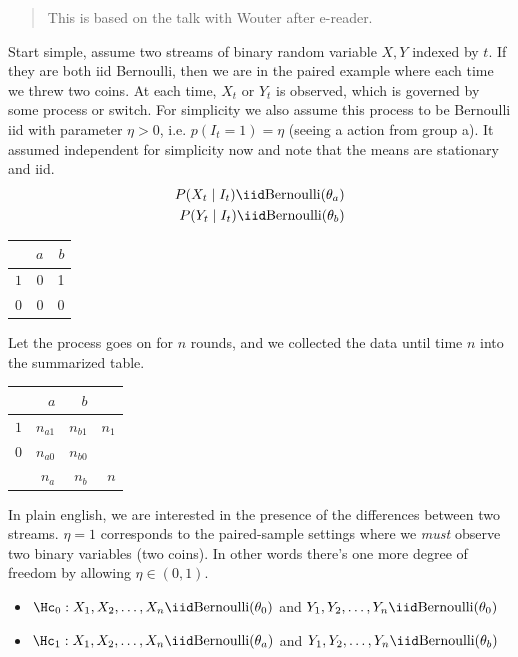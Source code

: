 \begin{quote}
	This is based on the talk with Wouter after e-reader.
\end{quote}

Start simple, assume two streams of binary random variable $X,Y$ indexed by $t$.
If they are both iid Bernoulli, then we are in the paired example where each time we threw two coins.
At each time, $X_t$ or $Y_t$ is observed, which is governed by some process or switch.
For simplicity we also assume this process to be Bernoulli iid with parameter $\eta>0$, i.e.
$p(I_t=1) = \eta$ (seeing a action from group a).
It assumed independent for simplicity now and note that the means are stationary and iid.
\begin{align*}
	P(X_t \mid I_t) \iid \mathrm{Bernoulli}(\theta_a) \\
	P(Y_t \mid I_t) \iid \mathrm{Bernoulli}(\theta_b)
\end{align*}

\begin{table}[h]
	\centering
	\begin{tabular}{lrr}
		\toprule
		    & $a$ & $b$ \\
		\midrule
		$1$ & 0   & 1   \\
		$0$ & 0   & 0   \\
		\bottomrule
	\end{tabular}
\end{table}

Let the process goes on for $n$ rounds, and we collected the data until time $n$ into the summarized table.
\begin{table}[h]
	\centering
	\begin{tabular}{lrrr}
		\toprule
		    & $a$      & $b$      &       \\
		\midrule
		$1$ & $n_{a1}$ & $n_{b1}$ & $n_1$ \\
		$0$ & $n_{a0}$ & $n_{b0}$ &       \\
		    & $n_a$    & $n_b$    & $n$   \\
		\bottomrule
	\end{tabular}
\end{table}

In plain english, we are interested in the presence of the differences between two streams.
$\eta=1$ corresponds to the paired-sample settings where we \emph{must} observe two binary variables (two coins).
In other words there's one more degree of freedom by allowing $\eta\in(0,1)$.

\begin{itemize}
	\item $\Hc_0: X_1,X_2,\dots,X_n\iid \mathrm{Bernoulli}(\theta_0)$ and $Y_1,Y_2,\dots,Y_n\iid \mathrm{Bernoulli}(\theta_0)$
	\item $\Hc_1: X_1,X_2,\dots,X_n\iid \mathrm{Bernoulli}(\theta_a)$ and $Y_1,Y_2,\dots,Y_n\iid \mathrm{Bernoulli}(\theta_b)$
\end{itemize}

